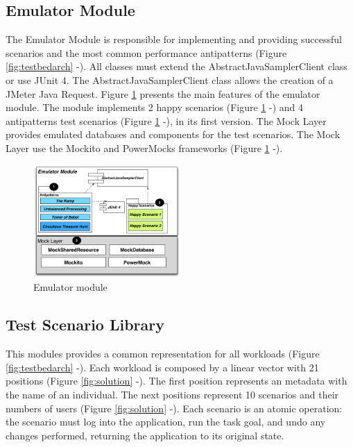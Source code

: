 \subsection{Emulator Module}

The Emulator Module is responsible for implementing and providing successful scenarios and the most common performance antipatterns (Figure \ref{fig:testbedarch}  -). All classes must extend the AbstractJavaSamplerClient class or use JUnit 4. The AbstractJavaSamplerClient class allows the creation of a JMeter Java Request. Figure \ref{fig:emulator} presents the main features of the emulator module. The module implements 2 happy scenarios (Figure \ref{fig:emulator}  -) and  4 antipatterns test scenarios (Figure \ref{fig:emulator}  -), in its first version. The Mock Layer provides emulated databases and components for the test scenarios. The Mock Layer use the Mockito and PowerMocks frameworks (Figure \ref{fig:emulator}  -). 

\begin{figure}[h]
\centering
\includegraphics[width=0.5\textwidth]{./images/emulator.png}
\caption{Emulator module}
\label{fig:emulator}
\end{figure}  

\subsection{Test Scenario Library}

This modules provides a common representation for all workloads (Figure \ref{fig:testbedarch}  -). Each workload is composed by a linear vector with 21 positions (Figure \ref{fig:solution}  -). The first position represents an metadata with the name of an individual. The next positions represent 10 scenarios and their numbers of users (Figure \ref{fig:solution}  -). Each scenario is an atomic operation: the scenario must log into the application, run the task goal, and undo any changes performed, returning the application to its original state. 

